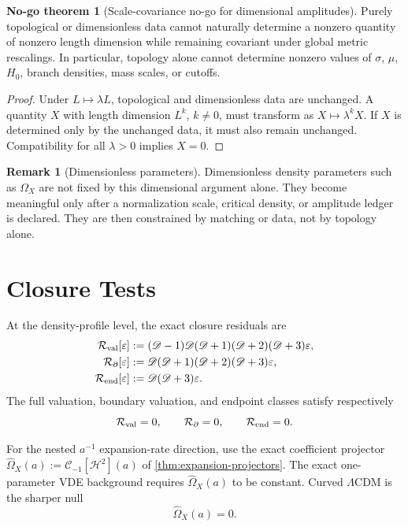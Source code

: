 \documentclass[aps,prd,reprint,onecolumn,nofootinbib,superscriptaddress,showkeys]{revtex4-2}
\numberwithin{equation}{section}
\theoremstyle{definition}
\newtheorem{remark}{Remark}[section]
\newtheorem{nogotheorem}{No-go theorem}[section]
\theoremstyle{plain}
\newcommand{\Dil}{\mathscr D}
\begin{document}
\begin{nogotheorem}[Scale-covariance no-go for dimensional amplitudes]
Purely topological or dimensionless data cannot naturally determine a nonzero quantity of nonzero length dimension while remaining covariant under global metric rescalings.  In particular, topology alone cannot determine nonzero values of \(\sigma\), \(\mu\), \(H_0\), branch densities, mass scales, or cutoffs.
\end{nogotheorem}

\begin{proof}
Under \(L\mapsto\lambda L\), topological and dimensionless data are unchanged.  A quantity \(X\) with length dimension \(L^k\), \(k\ne0\), must transform as \(X\mapsto\lambda^kX\).  If \(X\) is determined only by the unchanged data, it must also remain unchanged.  Compatibility for all \(\lambda>0\) implies \(X=0\).
\end{proof}

\begin{remark}[Dimensionless parameters]
Dimensionless density parameters such as \(\Omega_X\) are not fixed by this dimensional argument alone.  They become meaningful only after a normalization scale, critical density, or amplitude ledger is declared.  They are then constrained by matching or data, not by topology alone.
\end{remark}

\section{Closure Tests}

At the density-profile level, the exact closure residuals are
\begin{align}
\mathcal R_{\rm val}[\varepsilon]
&:=
(\Dil-1)\Dil(\Dil+1)(\Dil+2)(\Dil+3)\varepsilon,\\
\mathcal R_{\partial}[\varepsilon]
&:=
\Dil(\Dil+1)(\Dil+2)(\Dil+3)\varepsilon,\\
\mathcal R_{\rm end}[\varepsilon]
&:=
\Dil(\Dil+3)\varepsilon.
\end{align}
The full valuation, boundary valuation, and endpoint classes satisfy respectively
\begin{equation}
\mathcal R_{\rm val}=0,
\qquad
\mathcal R_{\partial}=0,
\qquad
\mathcal R_{\rm end}=0.
\end{equation}

For the nested \(a^{-1}\) expansion-rate direction, use the exact coefficient projector \(\widehat\Omega_X(a):=\mathcal C_{-1}[\mathcal H^2](a)\) of \cref{thm:expansion-projectors}.
The exact one-parameter VDE background requires \(\widehat\Omega_X(a)\) to be constant.  Curved \(\Lambda\)CDM is the sharper null
\begin{equation}
\widehat\Omega_X(a)=0.
\end{equation}
\end{document}
